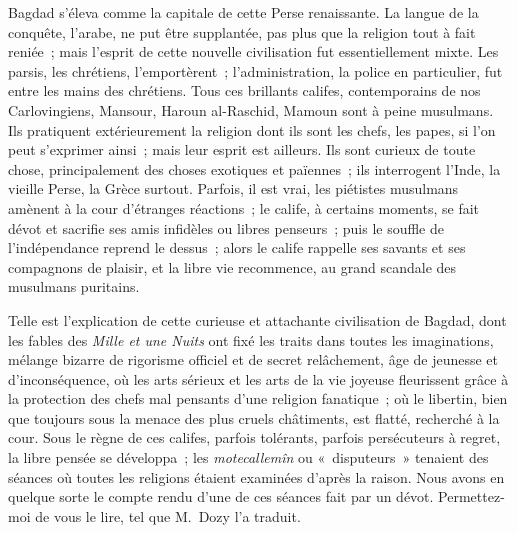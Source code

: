 \documentclass[french,twoside]{book} %
\newcommand\orgName[1]{#1}
\newcommand\persName[1]{#1}
\newcommand\placeName[1]{#1}
\begin{document}
{\placeName Bagdad} s’éleva comme la capitale de cette {\placeName Perse} renaissante. La langue de la conquête, l’arabe, ne put être supplantée, pas plus que la religion tout à fait reniée ; mais l’esprit de cette nouvelle civilisation fut essentiellement mixte. Les parsis, les chrétiens, l’emportèrent ; l’administration, la police en particulier, fut entre les mains des chrétiens. Tous ces brillants califes, contemporains de nos {\orgName Carlovingiens}, {\persName Mansour}, {\persName Haroun al-Raschid}, {\persName Mamoun} sont à peine musulmans. Ils pratiquent extérieurement la religion dont ils sont les chefs, les papes, si l’on peut s’exprimer ainsi ; mais leur esprit est ailleurs. Ils sont curieux de toute chose, principalement des choses exotiques et païennes ; ils interrogent l’{\orgName Inde}, la vieille {\orgName Perse}, la {\orgName Grèce} surtout. Parfois, il est vrai, les piétistes musulmans amènent à la cour d’étranges réactions ; le calife, à certains moments, se fait dévot et sacrifie ses amis infidèles ou libres penseurs ; puis le souffle de l’indépendance reprend le dessus ; alors le calife rappelle ses savants et ses compagnons de plaisir, et la libre vie recommence, au grand scandale des musulmans puritains.\par
Telle est l’explication de cette curieuse et attachante civilisation de {\placeName Bagdad}, dont les fables des \emph{Mille et une Nuits} ont fixé les traits dans toutes les imaginations, mélange bizarre de rigorisme officiel et de secret relâchement, âge de jeunesse et d’inconséquence, où les arts sérieux et les arts de la vie joyeuse fleurissent grâce à la protection des chefs mal pensants d’une religion fanatique ; où le libertin, bien que toujours sous la menace des plus cruels châtiments, est flatté, recherché à la cour. Sous le règne de ces califes, parfois tolérants, parfois persécuteurs à regret, la libre pensée se développa ; les {\itshape motecallemîn} ou « disputeurs » tenaient des séances où toutes les religions étaient examinées d’après la raison. Nous avons en quelque sorte le compte rendu d’une de ces séances fait par un dévot. Permettez-moi de vous le lire, tel que {\persName M. Dozy} l’a traduit.\par
\end{document}
